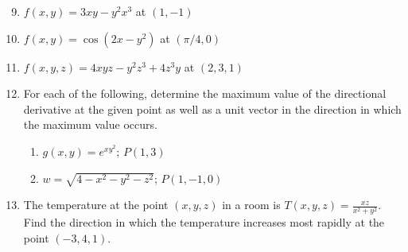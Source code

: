 \documentclass[12pt]{article}
\newif\ifans
\begin{document}

\begin{enumerate}
\setcounter{enumi}{8}

\item $f(x,y)=3xy-y^2x^3$ at $(1, -1)$ 

\ifans{\fbox{$\nabla f(1,-1)=-6\mathbf{i}+5\mathbf{j}$}} \fi

\item $f(x,y)=\cos{(2x-y^2)}$ at $(\pi/4, 0)$ 

\ifans{\fbox{$\nabla f\left(\frac{\pi}{4},0\right) = \langle-2,0\rangle$}} \fi

\item $f(x,y,z)=4xyz-y^2z^3+4z^3y$ at $(2, 3, 1)$ 

\ifans{\fbox{$\nabla f(2,3,1)= 12\mathbf{i}+6\mathbf{j}+33\mathbf{k}$}} \fi

\item For each of the following, determine the maximum value of the directional derivative at the given point as well as a unit vector in the direction in which the maximum value occurs.

\begin{enumerate}

\item $g(x,y)=e^{xy^2}$; $P(1, 3)$ 

\ifans{\fbox{\parbox{1\linewidth}{The maximum value of the directional derivative of $g$ at $P$ is $e^{9}\sqrt{117}$ which occurs in the direction of ${\bf u}=\left\langle \frac{9}{\sqrt{117}},\frac{6}{\sqrt{117}}\right\rangle$.}}} \fi

\item $w=\sqrt{4-x^2-y^2-z^2}$; $P(1, -1, 0)$ 

\ifans{\fbox{\parbox{1\linewidth}{The maximum value of the directional derivative of $w$ at $P$ is 1 which occurs in the direction of ${\bf u}=\left\langle -\frac{1}{\sqrt{2}}, \frac{1}{\sqrt{2}},0\right\rangle$.}}} \fi

\end{enumerate}

\item The temperature at the point $(x,y,z)$ in a room is $T(x,y,z)=\frac{xz}{x^2+y^2}$. Find the direction in which the temperature increases most rapidly at the point $(-3, 4,1)$.  

\ifans{\fbox{$\frac{7}{625}\mathbf{i}+\frac{24}{625}\mathbf{j}-\frac{3}{25}\mathbf{k}$}} \fi


\end{enumerate}
\end{document}
